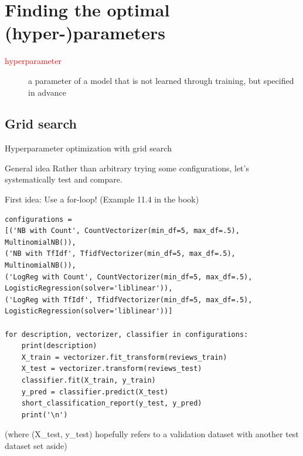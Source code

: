 \documentclass[compress]{beamer}
\begin{document}
\section{Finding the optimal (hyper-)parameters}

\begin{frame}[plain]
\centering
	\begin{description}
		\item[\textcolor{red}{hyperparameter}] a parameter of a model that is not learned through training, but specified in advance
	\end{description}
	
\end{frame}



\subsection{Grid search}

\begin{frame}{Hyperparameter optimization with grid search}
\begin{block}{General idea}
	Rather than arbitrary trying some configurations, let's systematically test and compare.
\end{block}
First idea: Use a for-loop! (Example 11.4 in the book)
\end{frame}

\begin{frame}
	\small
\begin{lstlisting}
configurations = 
[('NB with Count', CountVectorizer(min_df=5, max_df=.5), MultinomialNB()),
('NB with TfIdf', TfidfVectorizer(min_df=5, max_df=.5), MultinomialNB()),
('LogReg with Count', CountVectorizer(min_df=5, max_df=.5), LogisticRegression(solver='liblinear')),
('LogReg with TfIdf', TfidfVectorizer(min_df=5, max_df=.5), LogisticRegression(solver='liblinear'))]

for description, vectorizer, classifier in configurations:
    print(description)
    X_train = vectorizer.fit_transform(reviews_train)
    X_test = vectorizer.transform(reviews_test)
    classifier.fit(X_train, y_train)
    y_pred = classifier.predict(X_test)
    short_classification_report(y_test, y_pred)
    print('\n')
\end{lstlisting}
(where (X\_test, y\_test) hopefully refers to a validation dataset with another test dataset set aside) 
\end{frame}
\end{document}
